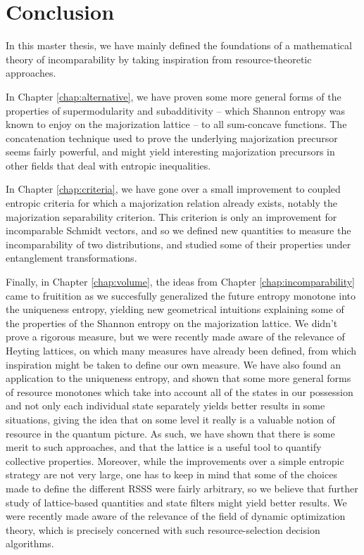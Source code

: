 \chapter{Conclusion}

In this master thesis, we have mainly defined the foundations of a mathematical theory of incomparability by taking inspiration from resource-theoretic approaches.

In Chapter \ref{chap:alternative}, we have proven some more general forms of the properties of supermodularity and subadditivity -- which Shannon entropy was known to enjoy on the majorization lattice -- to all sum-concave functions. The concatenation technique used to prove the underlying majorization precursor seems fairly powerful, and might yield interesting majorization precursors in other fields that deal with entropic inequalities.

In Chapter \ref{chap:criteria}, we have gone over a small improvement to coupled entropic criteria for which a majorization relation already exists, notably the majorization separability criterion. This criterion is only an improvement for incomparable Schmidt vectors, and so we defined new quantities to measure the incomparability of two distributions, and studied some of their properties under entanglement transformations.

Finally, in Chapter \ref{chap:volume}, the ideas from Chapter \ref{chap:incomparability} came to fruitition as we succesfully generalized the future entropy monotone into the uniqueness entropy, yielding new geometrical intuitions explaining some of the properties of the Shannon entropy on the majorization lattice. We didn't prove a rigorous measure, but we were recently made aware of the relevance of Heyting lattices, on which many measures have already been defined, from which inspiration might be taken to define our own measure. We have also found an application to the uniqueness entropy, and shown that some more general forms of resource monotones which take into account all of the states in our possession and not only each individual state separately yields better results in some situations, giving the idea that on some level it really is a valuable notion of resource in the quantum picture. As such, we have shown that there is some merit to such approaches, and that the lattice is a useful tool to quantify collective properties. Moreover, while the improvements over a simple entropic strategy are not very large, one has to keep in mind that some of the choices made to define the different RSSS were fairly arbitrary, so we believe that further study of lattice-based quantities and state filters might yield better results. We were recently made aware of the relevance of the field of dynamic optimization theory, which is precisely concerned with such resource-selection decision algorithms.

